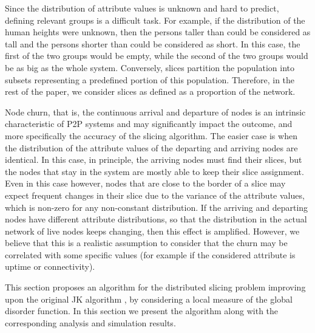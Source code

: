 \documentclass[times,10pt,twocolumn]{article}
\newcommand{\remove}[1]{}
\begin{document}
\remove{
Observe that another way of partitioning the population could be to define the
group of short persons as that containing all the persons shorter than a 
predefined measure (e.g., ) and the group of tall persons as that containing
the persons taller than this measure.
However, this way of partitioning would most certainly lead 
to have empty groups that contains no nodes (while a
slice is almost surely non-empty). 
} 

Since the distribution of attribute values is
unknown and hard to predict, defining relevant groups is a difficult task.  For
example, if the distribution of the human heights were unknown, then the persons
taller than  could be considered as tall and the persons shorter than 
could be considered as short. In this case, the first of the two groups would be 
empty, while the second of the two groups would be as big as the whole system.
Conversely, slices partition the population  
into subsets representing a predefined portion of this population.
Therefore, in the rest of the paper, we consider slices as defined as a proportion of the
network.

Node churn, that is, the continuous arrival and departure of nodes is an intrinsic characteristic 
of P2P systems and may significantly impact  the outcome, and more specifically the accuracy 
of the slicing algorithm.
The easier case is when  the distribution of the attribute values of the departing and
arriving nodes are identical.
In this case, in principle, the arriving nodes must find their slices, but
the nodes that stay in the system  are mostly able to keep their slice assignment.
Even in this case however, nodes that are close to the border of a slice
may expect frequent changes in their slice due to the variance of the
attribute values, which is non-zero for any non-constant distribution.
If the arriving and departing nodes have different attribute distributions,
 so that the distribution in the actual network of live nodes keeps changing,
then this effect is amplified. However, we believe that this is a realistic assumption
to consider that the churn may be correlated with some specific values (for example 
if the considered attribute is uptime or connectivity).


\label{sec:ordering}
\label{JK+}

This section proposes an  algorithm for the distributed slicing 
problem improving upon the original JK algorithm \cite{JK06},
 by considering a local measure of the global disorder function.
 In this section we present the algorithm along with the corresponding analysis and 
simulation results.
\end{document}
